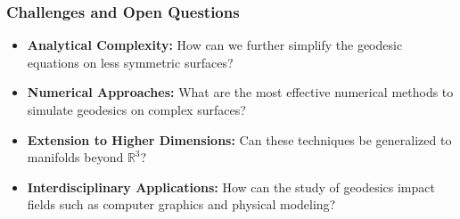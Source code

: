 \documentclass[12pt]{beamer}
\begin{document}

\begin{frame}
  \frametitle{Challenges and Open Questions}
  \begin{itemize}
    \item \textbf{Analytical Complexity:} How can we further simplify the geodesic equations on less symmetric surfaces?
    \item \textbf{Numerical Approaches:} What are the most effective numerical methods to simulate geodesics on complex surfaces?
    \item \textbf{Extension to Higher Dimensions:} Can these techniques be generalized to manifolds beyond \(\mathbb{R}^3\)?
    \item \textbf{Interdisciplinary Applications:} How can the study of geodesics impact fields such as computer graphics and physical modeling?
  \end{itemize}
\end{frame}
\end{document}
